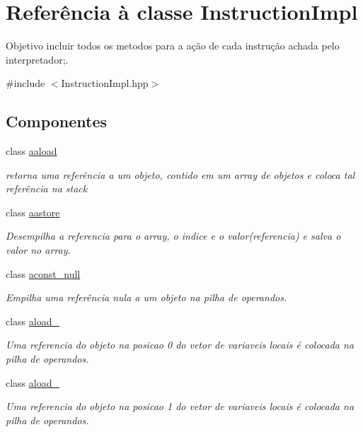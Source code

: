 \hypertarget{class_instruction_impl}{}\section{Referência à classe Instruction\+Impl}
\label{class_instruction_impl}


Objetivo incluir todos os metodos para a ação de cada instrução achada pelo interpretador;.  




{\ttfamily \#include $<$Instruction\+Impl.\+hpp$>$}

\subsection*{Componentes}
\begin{DoxyCompactItemize}
\item 
class \hyperlink{class_instruction_impl_1_1aaload}{aaload}
\begin{DoxyCompactList}\small\item\em retorna uma referência a um objeto, contido em um array de objetos e coloca tal referência na stack \end{DoxyCompactList}\item 
class \hyperlink{class_instruction_impl_1_1aastore}{aastore}
\begin{DoxyCompactList}\small\item\em Desempilha a referencia para o array, o indice e o valor(referencia) e salva o valor no array. \end{DoxyCompactList}\item 
class \hyperlink{class_instruction_impl_1_1aconst__null}{aconst\+\_\+null}
\begin{DoxyCompactList}\small\item\em Empilha uma referência nula a um objeto na pilha de operandos. \end{DoxyCompactList}\item 
class \hyperlink{class_instruction_impl_1_1aload__0}{aload\+\_}
\begin{DoxyCompactList}\small\item\em Uma referencia do objeto na posicao 0 do vetor de variaveis locais é colocada na pilha de operandos. \end{DoxyCompactList}\item 
class \hyperlink{class_instruction_impl_1_1aload__1}{aload\+\_}
\begin{DoxyCompactList}\small\item\em Uma referencia do objeto na posicao 1 do vetor de variaveis locais é colocada na pilha de operandos. \end{DoxyCompactList}\item 

\end{DoxyCompactItemize}
